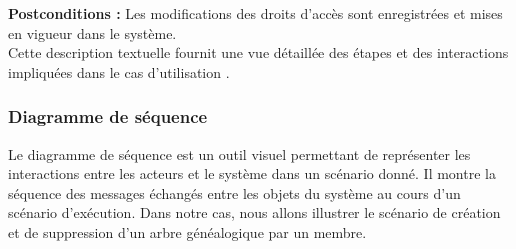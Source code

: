 \textbf{Postconditions :} Les modifications des droits d'accès sont enregistrées
et mises en vigueur dans le système.
\\

Cette description textuelle fournit une vue détaillée des étapes et des
interactions impliquées dans le cas d’utilisation .


\subsubsection{Diagramme de séquence}

Le diagramme de séquence est un outil visuel permettant de représenter les
interactions entre les acteurs et le système dans un scénario donné. Il montre
la séquence des messages échangés entre les objets du système au cours d’un
scénario d’exécution. Dans notre cas, nous allons illustrer le scénario de
création et de suppression d’un arbre généalogique par un membre.


